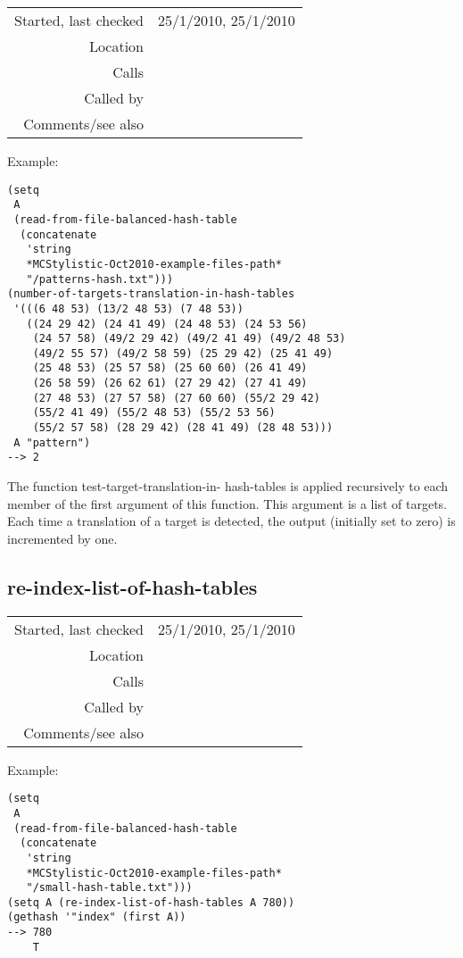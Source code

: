 \vspace{0.3cm}
\begin{tabular}{r|p{8cm}}
Started, last checked & 25/1/2010, 25/1/2010 \\
Location & \nameref{sec:hash-tables} \\
Calls & \nameref{fun:test-target-translation-in-hash-tables} \\
Called by & \\
Comments/see also &
\end{tabular}

\vspace{0.5cm}
\noindent Example:
\begin{verbatim}
(setq
 A
 (read-from-file-balanced-hash-table
  (concatenate
   'string
   *MCStylistic-Oct2010-example-files-path*
   "/patterns-hash.txt")))
(number-of-targets-translation-in-hash-tables
 '(((6 48 53) (13/2 48 53) (7 48 53))
   ((24 29 42) (24 41 49) (24 48 53) (24 53 56)
    (24 57 58) (49/2 29 42) (49/2 41 49) (49/2 48 53)
    (49/2 55 57) (49/2 58 59) (25 29 42) (25 41 49)
    (25 48 53) (25 57 58) (25 60 60) (26 41 49)
    (26 58 59) (26 62 61) (27 29 42) (27 41 49)
    (27 48 53) (27 57 58) (27 60 60) (55/2 29 42)
    (55/2 41 49) (55/2 48 53) (55/2 53 56)
    (55/2 57 58) (28 29 42) (28 41 49) (28 48 53)))
 A "pattern")
--> 2
\end{verbatim}

\noindent The function test-target-translation-in-
hash-tables is applied recursively to each member of
the first argument of this function. This argument is
a list of targets. Each time a translation of a target
is detected, the output (initially set to zero) is
incremented by one.


\subsection*{re-index-list-of-hash-tables}\label{fun:re-index-list-of-hash-tables}

\vspace{0.3cm}
\begin{tabular}{r|p{8cm}}
Started, last checked & 25/1/2010, 25/1/2010 \\
Location & \nameref{sec:hash-tables} \\
Calls & \\
Called by & \\
Comments/see also &
\end{tabular}

\vspace{0.5cm}
\noindent Example:
\begin{verbatim}
(setq
 A
 (read-from-file-balanced-hash-table
  (concatenate
   'string
   *MCStylistic-Oct2010-example-files-path*
   "/small-hash-table.txt")))
(setq A (re-index-list-of-hash-tables A 780))
(gethash '"index" (first A))
--> 780
    T
\end{verbatim}

